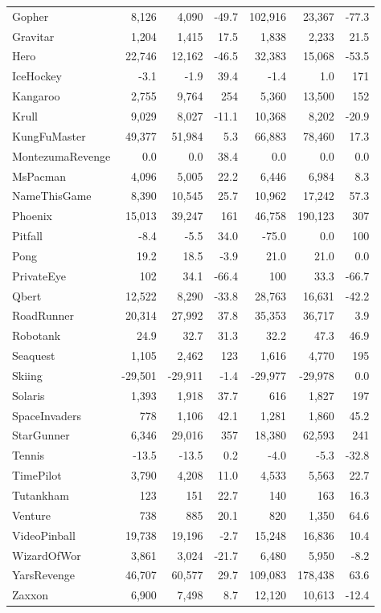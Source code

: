 \documentclass{article}
\begin{document}
\begin{appendices}
\begin{table}[htp]
\begin{center}
{\begin{tabular}{lrrrrrr}
Gopher & 8,126 & 4,090 & -49.7 & 102,916 & 23,367 & -77.3 \\
Gravitar & 1,204 & 1,415 & 17.5 & 1,838 & 2,233 & 21.5 \\
Hero & 22,746 & 12,162 & -46.5 & 32,383 & 15,068 & -53.5 \\
IceHockey & -3.1 & -1.9 & 39.4 & -1.4 & 1.0 & 171 \\
Kangaroo & 2,755 & 9,764 & 254 & 5,360 & 13,500 & 152 \\
Krull & 9,029 & 8,027 & -11.1 & 10,368 & 8,202 & -20.9 \\
KungFuMaster & 49,377 & 51,984 & 5.3 & 66,883 & 78,460 & 17.3 \\
MontezumaRevenge & 0.0 & 0.0 & 38.4 & 0.0 & 0.0 & 0.0 \\
MsPacman & 4,096 & 5,005 & 22.2 & 6,446 & 6,984 & 8.3 \\
NameThisGame & 8,390 & 10,545 & 25.7 & 10,962 & 17,242 & 57.3 \\
Phoenix & 15,013 & 39,247 & 161 & 46,758 & 190,123 & 307 \\
Pitfall & -8.4 & -5.5 & 34.0 & -75.0 & 0.0 & 100 \\
Pong & 19.2 & 18.5 & -3.9 & 21.0 & 21.0 & 0.0 \\
PrivateEye & 102 & 34.1 & -66.4 & 100 & 33.3 & -66.7 \\
Qbert & 12,522 & 8,290 & -33.8 & 28,763 & 16,631 & -42.2 \\
RoadRunner & 20,314 & 27,992 & 37.8 & 35,353 & 36,717 & 3.9 \\
Robotank & 24.9 & 32.7 & 31.3 & 32.2 & 47.3 & 46.9 \\
Seaquest & 1,105 & 2,462 & 123 & 1,616 & 4,770 & 195 \\
Skiing & -29,501 & -29,911 & -1.4 & -29,977 & -29,978 & 0.0 \\
Solaris & 1,393 & 1,918 & 37.7 & 616 & 1,827 & 197 \\
SpaceInvaders & 778 & 1,106 & 42.1 & 1,281 & 1,860 & 45.2 \\
StarGunner & 6,346 & 29,016 & 357 & 18,380 & 62,593 & 241 \\
Tennis & -13.5 & -13.5 & 0.2 & -4.0 & -5.3 & -32.8 \\
TimePilot & 3,790 & 4,208 & 11.0 & 4,533 & 5,563 & 22.7 \\
Tutankham & 123 & 151 & 22.7 & 140 & 163 & 16.3 \\
Venture & 738 & 885 & 20.1 & 820 & 1,350 & 64.6 \\
VideoPinball & 19,738 & 19,196 & -2.7 & 15,248 & 16,836 & 10.4 \\
WizardOfWor & 3,861 & 3,024 & -21.7 & 6,480 & 5,950 & -8.2 \\
YarsRevenge & 46,707 & 60,577 & 29.7 & 109,083 & 178,438 & 63.6 \\
Zaxxon & 6,900 & 7,498 & 8.7 & 12,120 & 10,613 & -12.4 \\


\end{tabular}}
\end{center}
\end{table}
\end{appendices}
\end{document}
